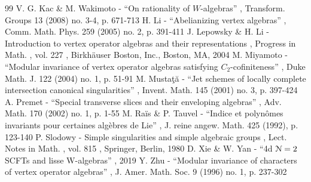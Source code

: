 \documentclass[11pt]{article}
\numberwithin{equation}{section}
\let\mathcal \EuScript
\theoremstyle{definition}
\begin{document}
\begin{thebibliography}{99}
 V. G. Kac \& M. Wakimoto - “On rationality of $W$-algebras” , Transform. Groups 13 (2008) no. 3-4, p. 671-713
 H. Li - “Abelianizing vertex algebras” , Comm. Math. Phys. 259 (2005) no. 2, p. 391-411
 J. Lepowsky \& H. Li - Introduction to vertex operator algebras and their representations , Progress in Math. , vol. 227 , Birkhäuser Boston, Inc., Boston, MA, 2004
 M. Miyamoto - “Modular invariance of vertex operator algebras satisfying $C_2$-cofiniteness” , Duke Math. J. 122 (2004) no. 1, p. 51-91
 M. Mustaţă - “Jet schemes of locally complete intersection canonical singularities” , Invent. Math. 145 (2001) no. 3, p. 397-424
 A. Premet - “Special transverse slices and their enveloping algebras” , Adv. Math. 170 (2002) no. 1, p. 1-55
 M. Raïs \& P. Tauvel - “Indice et polynômes invariants pour certaines algèbres de Lie” , J. reine angew. Math. 425 (1992), p. 123-140
 P. Slodowy - Simple singularities and simple algebraic groups , Lect. Notes in Math. , vol. 815 , Springer, Berlin, 1980
 D. Xie \& W. Yan - “4d $\mathcal{N}=2$ SCFTs and lisse W-algebras” , 2019
 Y. Zhu - “Modular invariance of characters of vertex operator algebras” , J. Amer. Math. Soc. 9 (1996) no. 1, p. 237-302
\end{thebibliography}
\end{document}
